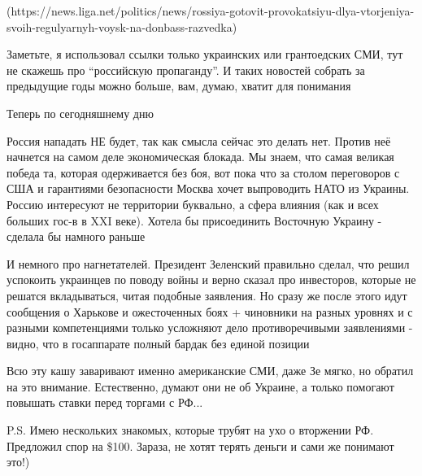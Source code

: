 (https://news.liga.net/politics/news/rossiya-gotovit-provokatsiyu-dlya-vtorjeniya-svoih-regulyarnyh-voysk-na-donbass-razvedka)


Заметьте,
я использовал ссылки только украинских или грантоедских СМИ, тут не скажешь
про \enquote{российскую пропаганду}. И таких новостей собрать за предыдущие годы можно
больше, вам, думаю, хватит для понимания

Теперь по сегодняшнему дню

Россия нападать НЕ будет, так как смысла сейчас это делать нет. Против неё
начнется на самом деле экономическая блокада. Мы знаем, что самая великая
победа та, которая одерживается без боя, вот пока что за столом переговоров с
США и гарантиями безопасности Москва хочет выпроводить НАТО из Украины. Россию
интересуют не территории буквально, а сфера влияния (как и всех больших гос-в в
XXI веке). Хотела бы присоединить Восточную Украину - сделала бы намного раньше

И немного про нагнетателей. Президент Зеленский правильно сделал, что решил
успокоить украинцев по поводу войны и верно сказал про инвесторов, которые не
решатся вкладываться, читая подобные заявления. Но сразу же после этого идут
сообщения о Харькове и ожесточенных боях + чиновники на разных уровнях и с
разными компетенциями только усложняют дело противоречивыми заявлениями -
видно, что в госаппарате полный бардак без единой позиции

Всю эту кашу заваривают именно американские СМИ, даже Зе мягко, но обратил на
это внимание. Естественно, думают они не об Украине, а только помогают повышать
ставки перед торгами с РФ...

P.S. Имею нескольких знакомых, которые трубят на ухо о вторжении РФ. Предложил
спор на \$100. Зараза, не хотят терять деньги и сами же понимают это!)
